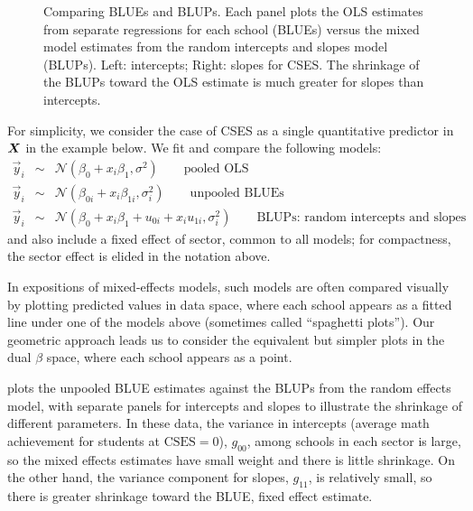 \begin{figure}[htb]
\begin{minipage}[b]{.49\linewidth}
 \end{minipage}
  \caption{Comparing BLUEs and BLUPs. Each panel plots the OLS estimates from separate regressions for each school (BLUEs)
  versus the mixed model estimates from the random intercepts and slopes model (BLUPs).
  Left: intercepts; Right: slopes for CSES.  The shrinkage of the BLUPs toward the OLS estimate is much greater for slopes than
  intercepts. }
  \label{fig:hsbmix4}
\end{figure}

For simplicity, we consider the case of CSES as
a single quantitative predictor in $\bm{X}$ in the example below.  We fit and compare the following models:
\begin{eqnarray}
 \vec{y}_{i} & \sim & \mathcal{N} ( \beta_0 + x_{i} \beta_1 , \sigma^2 ) \quad\quad \textrm{pooled OLS} \\
 \vec{y}_{i} & \sim & \mathcal{N} ( \beta_{0i} + x_{i} \beta_{1i} , \sigma^2_i ) \quad\quad \textrm{unpooled BLUEs} \\
 \vec{y}_{i} & \sim & \mathcal{N} ( \beta_{0} + x_{i} \beta_{1} + u_{0i} + x_{i} u_{1i} , \sigma^2_i ) \quad\quad \textrm{BLUPs: random intercepts and slopes}
%
\end{eqnarray}
and also include a fixed effect of sector, common to all models; for compactness, the sector effect is elided in the notation above.

In expositions of mixed-effects models, such models are often compared visually by plotting predicted values in data space, where each school appears
as a fitted line under one of the models above (sometimes called ``spaghetti plots'').
Our geometric approach leads us to consider the equivalent but simpler plots in the dual $\beta$ space,
where each school appears as a point.

 plots the unpooled BLUE estimates against the BLUPs from the random effects model, with separate panels for intercepts
and slopes to illustrate the shrinkage of different parameters.  In these data, the variance in intercepts (average math achievement
for students at $\mathrm{CSES}=0$), $g_{00}$,
among schools in each sector is large, so the mixed effects estimates have small weight and there is little
shrinkage.  On the other hand, the variance component for slopes, $g_{11}$, is relatively small, so there is greater
shrinkage toward the BLUE, fixed effect estimate.

